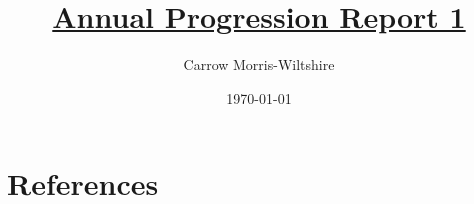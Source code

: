 \documentclass[a4paper,11pt]{article}
\title{\href{https://carrowmw.github.io/latex-documents/}{Annual Progression Report 1}}
\author{Carrow Morris-Wiltshire}
\date{\today}
\begin{document}
\thispagestyle{empty}


\newpage

\label{sec:introduction}


\label{sec:aim_objectives_scope}


\label{sec:approach_and_methodology}


\label{sec:progress_to_date}


\label{sec:work_plan}


\label{sec:financial expenditure}


\label{sec:bibliography}
\newpage
\section{References}

\end{document}
